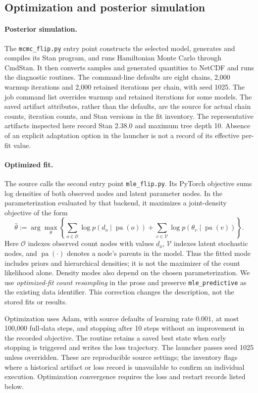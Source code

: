 \subsection{Optimization and posterior simulation}
\label{app:inference-details}

\paragraph{Posterior simulation.}
The \texttt{mcmc\_flip.py} entry point constructs the selected model,
generates and compiles its Stan program, and runs Hamiltonian Monte Carlo
through CmdStan. It then converts samples and generated quantities to NetCDF
and runs the diagnostic routines. The command-line defaults are eight chains,
2,000 warmup iterations and 2,000 retained iterations per chain, with seed
1025. The job command list overrides warmup and retained iterations for some
models. The saved artifact attributes, rather than the defaults, are the
source for actual chain counts, iteration counts, and Stan versions in the
fit inventory. The representative artifacts inspected here record Stan 2.38.0
and maximum tree depth 10. Absence of an explicit adaptation option in the
launcher is not a record of its effective per-fit value.

\paragraph{Optimized fit.}
The source calls the second entry point \texttt{mle\_flip.py}. Its
PyTorch objective sums log densities of both
observed nodes and latent parameter nodes. In the parameterization evaluated
by that backend, it maximizes a joint-density objective of the form
\[
\hat\theta:=\arg\max_\theta
\left\{\sum_{o\in\mathcal O}\log p(d_o\mid\operatorname{pa}(o))
+\sum_{v\in\mathcal V}\log p(\theta_v\mid\operatorname{pa}(v))\right\}.
\]
Here $\mathcal O$ indexes observed count nodes with values $d_o$,
$\mathcal V$ indexes latent stochastic nodes, and
$\operatorname{pa}(\cdot)$ denotes a node's parents in the model. Thus the
fitted mode includes priors and hierarchical densities; it is not the
maximizer of the count likelihood alone. Density modes also depend on the
chosen parameterization. We use \emph{optimized-fit count resampling} in the
prose and preserve \texttt{mle\_predictive} as the existing data identifier.
This correction changes the description, not the stored fits or results.

Optimization uses Adam, with source defaults of learning rate $0.001$, at
most 100,000 full-data steps, and stopping after 10 steps without an improvement
in the recorded objective. The routine retains a saved best state when early
stopping is triggered and writes the loss trajectory. The launcher passes
seed 1025 unless overridden. These are reproducible source settings; the
inventory flags where a historical artifact or loss record is unavailable
to confirm an individual execution. Optimization convergence requires the
loss and restart records listed below.

